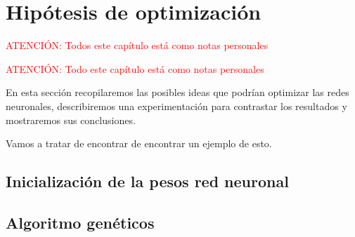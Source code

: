 %

\chapter{Hipótesis de optimización }
\textcolor{red}{ATENCIÓN: Todos este capítulo está como notas personales}

\textcolor{red}{ATENCIÓN: Todo este capítulo está como notas personales}  

En esta sección recopilaremos las posibles ideas que podrían optimizar las 
redes neuronales, describiremos una experimentación para contrastar los resultados y mostraremos sus conclusiones. 

Vamos a tratar de encontrar de encontrar un ejemplo de esto.

\section{Inicialización de la pesos red neuronal}\label{hypothesis:pesos-iniciales}

\section{Algoritmo genéticos}

